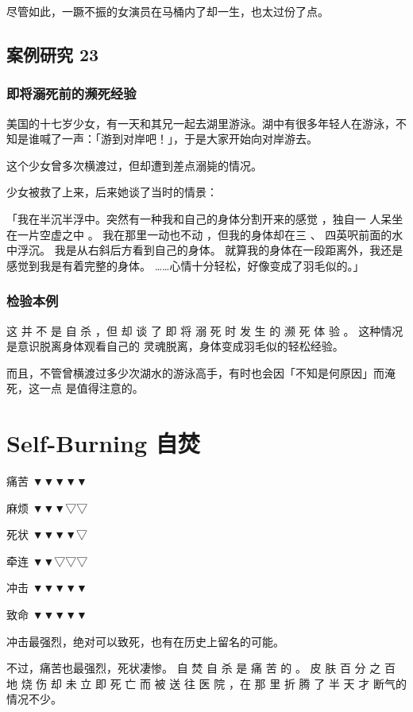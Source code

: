 \documentclass[UTF8]{ctexart}
\begin{document}
尽管如此，一蹶不振的女演员在马桶内了却一生，也太过份了点。


\subsection{案例研究 23}

\subsubsection*{即将溺死前的濒死经验}

美国的十七岁少女，有一天和其兄一起去湖里游泳。湖中有很多年轻人在游泳，不知是谁喊了一声：「游到对岸吧！」，于是大家开始向对岸游去。

这个少女曾多次横渡过，但却遭到差点溺毙的情况。

少女被救了上来，后来她谈了当时的情景：

「我在半沉半浮中。突然有一种我和自己的身体分割开来的感觉 ，独自一 人呆坐在一片空虚之中 。
我在那里一动也不动 ，但我的身体却在三 、 四英呎前面的水中浮沉。
我是从右斜后方看到自己的身体。
就算我的身体在一段距离外，我还是感觉到我是有着完整的身体。
……心情十分轻松，好像变成了羽毛似的。」

\subsubsection*{检验本例}

这 并 不 是 自 杀 ，但 却 谈 了 即 将 溺 死 时 发 生 的 濒 死 体 验 。
这种情况是意识脱离身体观看自己的 灵魂脱离，身体变成羽毛似的轻松经验。

而且，不管曾横渡过多少次湖水的游泳高手，有时也会因「不知是何原因」而淹死，这一点
是值得注意的。


\newpage

\section{Self-Burning 自焚}

痛苦 ▼▼▼▼▼

麻烦 ▼▼▼▽▽

死状 ▼▼▼▼▽

牵连 ▼▼▽▽▽

冲击 ▼▼▼▼▼

致命 ▼▼▼▼▼

冲击最强烈，绝对可以致死，也有在历史上留名的可能。

不过，痛苦也最强烈，死状凄惨。
自 焚 自 杀 是 痛 苦 的 。
皮 肤 百 分 之 百 地 烧 伤 却 未 立 即 死 亡 而 被 送 往 医 院 ，在 那 里 折 腾 了 半 天 才 断气的情况不少。
\end{document}

